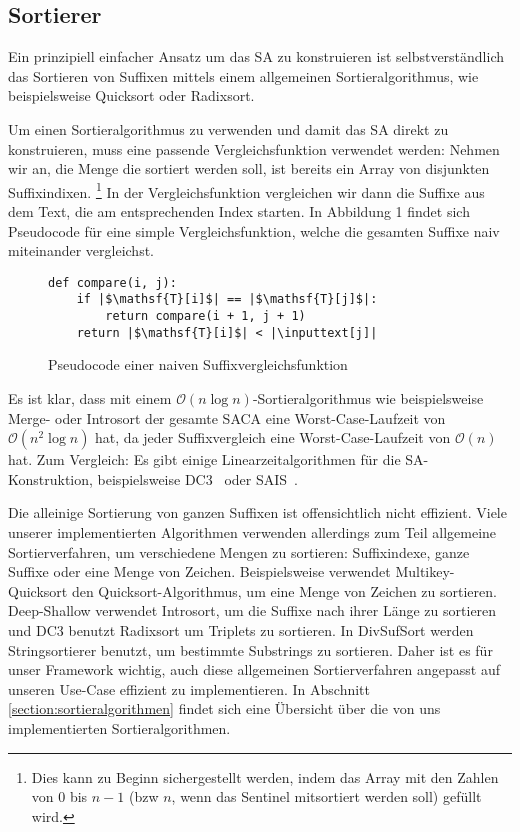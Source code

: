 \subsection{Sortierer}
Ein  prinzipiell einfacher Ansatz um das SA zu konstruieren
ist selbstverständlich das Sortieren von Suffixen mittels einem allgemeinen Sortieralgorithmus,
wie beispielsweise Quicksort oder Radixsort.

Um einen Sortieralgorithmus zu verwenden und damit das SA direkt zu konstruieren,
muss eine passende Vergleichsfunktion verwendet werden:
Nehmen wir an, die Menge die sortiert werden soll, ist bereits ein Array von disjunkten Suffixindixen.
\footnote{Dies kann zu Beginn sichergestellt werden, indem das
Array mit den Zahlen von 0 bis $n-1$ (bzw $n$, wenn das Sentinel mitsortiert werden soll) gefüllt wird.}
In der Vergleichsfunktion vergleichen wir dann die Suffixe aus dem Text, die am entsprechenden Index starten.
In Abbildung 1 findet sich Pseudocode für eine simple Vergleichsfunktion,
welche die gesamten Suffixe naiv miteinander vergleichst.

\begin{figure}[!h]
\begin{verbatim}
def compare(i, j):
    if |$\mathsf{T}[i]$| == |$\mathsf{T}[j]$|:
        return compare(i + 1, j + 1)
    return |$\mathsf{T}[i]$| < |\inputtext[j]|
\end{verbatim}
\caption{Pseudocode einer naiven Suffixvergleichsfunktion}
\end{figure}
%
Es ist klar, dass mit einem $\mathcal O(n \log n)$-Sortieralgorithmus wie beispielsweise
Merge- oder Introsort der gesamte SACA eine Worst-Case-Laufzeit von $\mathcal O(n^2 \log n)$ hat,
da jeder Suffixvergleich eine Worst-Case-Laufzeit von $\mathcal O(n)$ hat.
Zum Vergleich: Es gibt einige Linearzeitalgorithmen für die SA-Konstruktion, beispielsweise DC3~\cite{saca:9} oder SAIS~\cite{saca:6}.

Die alleinige Sortierung von ganzen Suffixen ist offensichtlich nicht effizient.
Viele unserer implementierten Algorithmen verwenden allerdings zum Teil allgemeine Sortierverfahren,
um verschiedene Mengen zu sortieren: Suffixindexe, ganze Suffixe oder eine Menge von Zeichen.
Beispielsweise verwendet Multikey-Quicksort den Quicksort-Algorithmus, um eine Menge von Zeichen zu sortieren.
Deep-Shallow verwendet Introsort, um die Suffixe nach ihrer Länge zu sortieren
und DC3 benutzt Radixsort um Triplets zu sortieren.
In DivSufSort werden Stringsortierer benutzt, um bestimmte Substrings zu sortieren.
Daher ist es für unser Framework wichtig, auch diese allgemeinen Sortierverfahren angepasst
auf unseren Use-Case effizient zu implementieren.
In Abschnitt \ref{section:sortieralgorithmen} findet sich eine Übersicht über die von uns
implementierten Sortieralgorithmen.
